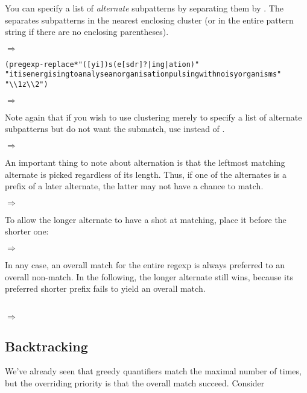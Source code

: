 You can specify a list of \emph{alternate} subpatterns by separating
them by \code{|}.  The \code{|} separates subpatterns in the nearest
enclosing cluster (or in the entire pattern string if there are no
enclosing parentheses).

$\Rightarrow$ 

\begin{alltt}
(pregexp-replace* "([yi])s(e[sdr]?|ing|ation)"
 "it is energising to analyse an organisation pulsing with noisy organisms"
 "{\textbackslash\textbackslash}1z{\textbackslash\textbackslash}2")
\end{alltt}\antipar
$\Rightarrow$ 

Note again that if you wish to use clustering merely to specify a list
of alternate subpatterns but do not want the submatch, use 
instead of \code{(}.

 $\Rightarrow$

An important thing to note about alternation is that the leftmost
matching alternate is picked regardless of its length.  Thus, if one
of the alternates is a prefix of a later alternate, the latter may not
have a chance to match.

 $\Rightarrow$

To allow the longer alternate to have a shot at matching, place it
before the shorter one:

 $\Rightarrow$

In any case, an overall match for the entire regexp is always
preferred to an overall non-match.  In the following, the longer
alternate still wins, because its preferred shorter prefix fails to
yield an overall match.

 \\
$\Rightarrow$ 

\subsection {Backtracking}

We've already seen that greedy quantifiers match the maximal number of
times, but the overriding priority is that the overall match succeed.
Consider

